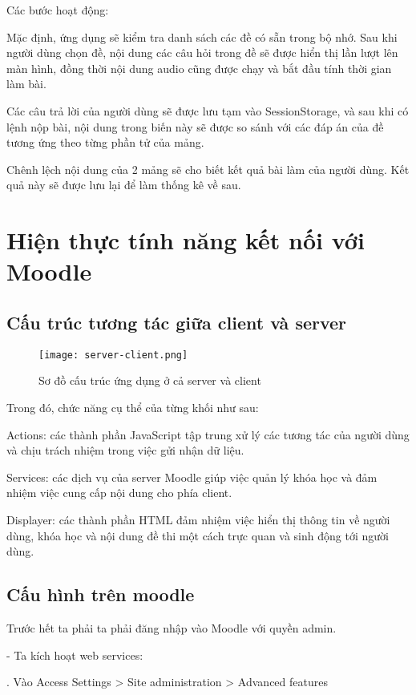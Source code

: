 Các bước hoạt động:

\quad Mặc định, ứng dụng sẽ kiểm tra danh sách các đề có sẵn trong bộ nhớ. Sau khi người dùng chọn đề, nội dung các câu hỏi trong đề sẽ được hiển thị lần lượt lên màn hình, đồng thời nội dung audio cũng được chạy và bắt đầu tính thời gian làm bài.

\quad Các câu trả lời của người dùng sẽ được lưu tạm vào SessionStorage, và sau khi có lệnh nộp bài, nội dung trong biến này sẽ được so sánh với các đáp án của đề tương ứng theo từng phần tử của mảng.

\quad Chênh lệch nội dung của 2 mảng sẽ cho biết kết quả bài làm của người dùng. Kết quả này sẽ được lưu lại để làm thống kê về sau.


\section{Hiện thực tính năng kết nối với Moodle}
\subsection{Cấu trúc tương tác giữa client và server}

\begin{figure}[!htb] 
\centering
\texttt{[image: server-client.png]}
\caption{Sơ đồ cấu trúc ứng dụng ở cả server và client}
\end{figure}

Trong đó, chức năng cụ thể của từng khối như sau:

\quad Actions: các thành phần JavaScript tập trung xử lý các tương tác của người dùng và chịu trách nhiệm trong việc gửi nhận dữ liệu.

\quad Services: các dịch vụ của server Moodle giúp việc quản lý khóa học và đảm nhiệm việc cung cấp nội dung cho phía client.

\quad Displayer: các thành phần HTML đảm nhiệm việc hiển thị thông tin về người dùng, khóa học và nội dung đề thi một cách trực quan và sinh động tới người dùng.

\subsection{Cấu hình trên moodle}

Trước hết ta phải ta phải đăng nhập vào Moodle với quyền admin.

- Ta kích hoạt web services:

. Vào Access Settings > Site administration > Advanced features
 
